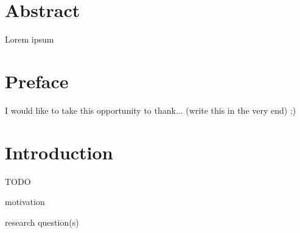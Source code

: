 \documentclass[
10pt, %
a4paper, %
oneside, %
headinclude,footinclude, %
] {book}%
\begin{document}

\chapter*{Abstract}
Lorem ipsum
\clearpage
\setcounter{tocdepth}{3} %
\tableofcontents %







\chapter*{Preface}

I would like to take this opportunity to thank... (write this in the very end) ;)





\chapter{Introduction}

TODO

motivation

research question(s)
\end{document}
